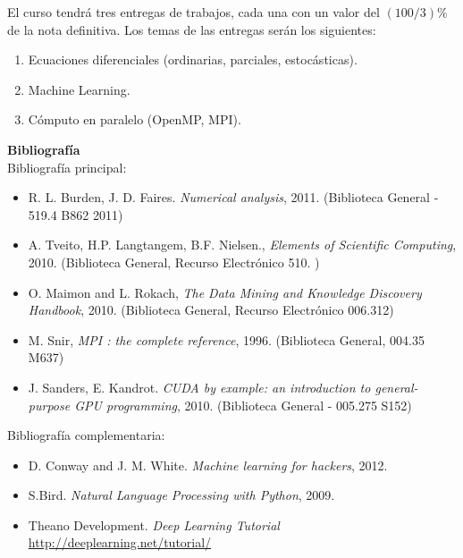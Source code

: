 \documentclass[letterpaper,10pt,onecolumn]{article}
\begin{document}
El curso tendr\'a tres entregas de trabajos, cada una con un valor
del $(100/3) \%$ de la nota definitiva. Los temas de las entregas ser\'an
los siguientes:
\begin{enumerate}
\item Ecuaciones diferenciales (ordinarias, parciales, estoc\'asticas).
\\[-0.6cm]
\item Machine Learning.
\\[-0.6cm]
\item C\'omputo en paralelo (OpenMP, MPI).
\\[-0.2cm]
\end{enumerate}


\noindent\textbf{\large {} \quad
  Bibliograf\'ia}\\[-0.2cm] 


\noindent\normalsize Bibliograf\'ia principal:

\begin{itemize}
\item R. L. Burden, J. D. Faires. \textit{Numerical analysis},
  2011. (Biblioteca General - 519.4 B862 2011)\\[-0.6cm]
\item A. Tveito, H.P. Langtangem, B.F. Nielsen., \textit{Elements of
  Scientific Computing}, 2010.  (Biblioteca General, Recurso
  Electr\'onico 510. )\\[-0.6cm] 
\item O. Maimon and L. Rokach, \textit{The Data Mining and Knowledge
  Discovery Handbook}, 2010. (Biblioteca General, Recurso
  Electr\'onico 006.312)\\[-0.6cm]
\item M. Snir, \textit{MPI : the complete reference},
  1996. (Biblioteca General, 004.35 M637)\\[-0.6cm]
\item J. Sanders, E. Kandrot. \textit{CUDA by example: an
  introduction to general-purpose GPU programming}, 2010. (Biblioteca
  General - 005.275 S152)\\[-0.2cm]
\end{itemize} 

\noindent\normalsize Bibliograf\'ia complementaria:

\begin{itemize}
\item D. Conway and J. M. White. \textit{Machine learning for
    hackers}, 2012.\\[-0.6cm]
\item S.Bird. \textit{Natural Language Processing with
  Python}, 2009.\\[-0.6cm]
\item Theano Development. \textit{Deep Learning Tutorial}
  \url{http://deeplearning.net/tutorial/}  \\[-0.2cm]
\end{itemize}
\end{document}
